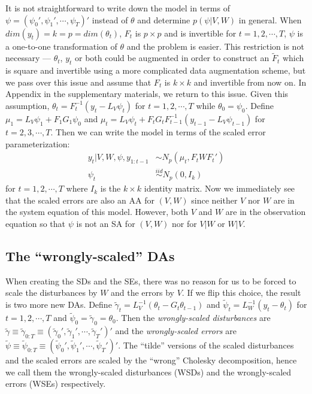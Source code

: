 \documentclass[12pt]{article}
\begin{document}
It is not straightforward to write down the model in terms of $\psi=(\psi_0',\psi_1',\cdots,\psi_T)'$ instead of $\theta$ and determine $p(\psi|V,W)$ in general. When $dim(y_t)=k=p=dim(\theta_t)$, $F_t$ is $p\times p$ and is invertible for $t=1,2,\cdots,T$, $\psi$ is a one-to-one transformation of $\theta$ and the problem is easier. This restriction is not necessary --- $\theta_t$, $y_t$ or both could be augmented in order to construct an $\tilde{F}_t$ which is square and invertible using a more complicated data augmentation scheme, but we pass over this issue and assume that $F_t$ is $k\times k$ and invertible from now on. In Appendix  in the supplementary materials, we return to this issue. Given this assumption, $\theta_t = F_t^{-1}(y_t - L_V\psi_t)$ for $t=1,2,\cdots,T$ while $\theta_0=\psi_0$. Define $\mu_1 = L_V\psi_1 + F_1G_1\psi_0$ and $\mu_t =L_V\psi_t + F_tG_tF_{t-1}^{-1}(y_{t-1} - L_{V}\psi_{t-1})$ for $t=2,3,\cdots,T$. Then we can write the model in terms of the scaled error parameterization:
\begin{align*}
  y_t|V,W,\psi,y_{1:t-1} &\sim N_p(\mu_t, F_tWF_t')\\
  \psi_t & \stackrel{iid}{\sim} N_p(0,I_k)
\end{align*}
for $t=1,2,\cdots,T$ where $I_k$ is the $k\times k$ identity matrix. Now we immediately see that the scaled errors are also an AA for $(V,W)$ since neither $V$ nor $W$ are in the system equation of this model. However, both $V$ and $W$ are in the observation equation so that $\psi$ is not an SA for $(V,W)$ nor for $V|W$ or $W|V$.

\subsection{The ``wrongly-scaled'' DAs}
When creating the SDs and the SEs, there was no reason for us to be forced to scale the disturbances by $W$ and the errors by $V$. If we flip this choice, the result is two more new DAs. Define $\tilde{\gamma}_t=L_V^{-1}(\theta_t - G_t\theta_{t-1})$ and $\tilde{\psi}_t=L_W^{-1}(y_t - \theta_t)$ for $t=1,2,\cdots,T$ and $\tilde{\psi}_0=\tilde{\gamma}_0=\theta_0$. Then the {\it wrongly-scaled disturbances} are $\tilde{\gamma}\equiv\tilde{\gamma}_{0:T}\equiv(\tilde{\gamma}_0',\tilde{\gamma}_1',\cdots,\tilde{\gamma}_T')'$ and the {\it wrongly-scaled errors} are $\tilde{\psi}\equiv\tilde{\psi}_{0:T}\equiv(\tilde{\psi}_0',\tilde{\psi}_1',\cdots,\tilde{\psi}_T')'$. The ``tilde'' versions of the scaled disturbances and the scaled errors are scaled by the ``wrong'' Cholesky decomposition, hence we call them the wrongly-scaled disturbances (WSDs) and the wrongly-scaled errors (WSEs) respectively.
\end{document}
